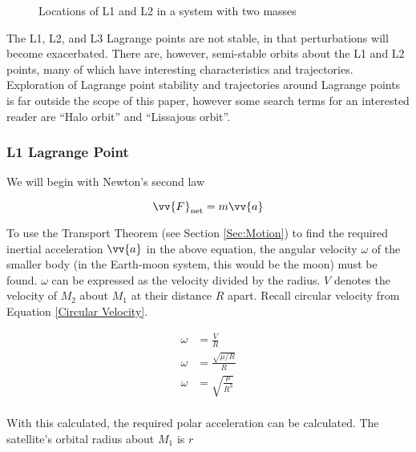 \documentclass[../basicOrbitalDynamics.tex]{subfiles}
\begin{document}
\begin{figure}[H]
    \centering
    \caption{Locations of L1 and L2 in a system with two masses}\label{fig:Lagrange Points}
\end{figure}

The L1, L2, and L3 Lagrange points are not stable, in that perturbations will become exacerbated. There are, however, semi-stable orbits about the L1 and L2 points, many of which have interesting characteristics and trajectories. Exploration of Lagrange point stability and trajectories around Lagrange points is far outside the scope of this paper, however some search terms for an interested reader are ``Halo orbit'' and ``Lissajous orbit''.

\subsubsection{L1 Lagrange Point}

We will begin with Newton's second law

\[\st{\vv{F}}{net}=m\vv{a}\]

To use the Transport Theorem (see Section \ref{Sec:Motion}) to find the required inertial acceleration $\vv{a}$ in the above equation, the angular velocity $\omega$ of the smaller body (in the Earth-moon system, this would be the moon) must be found. $\omega$ can be expressed as the velocity divided by the radius. $V$ denotes the velocity of $M_2$ about $M_1$ at their distance $R$ apart. Recall circular velocity from Equation \eqref{Circular Velocity}.

\begin{align*}
    \omega & =\frac{V}{R}  \\
    \omega & =\frac{\sqrt{\mu/R}}{R} \\
    \omega & =\sqrt{\frac{\mu}{R^3}} \\
\end{align*}

With this calculated, the required polar acceleration can be calculated. The satellite's orbital radius about $M_1$ is $r$
\end{document}
